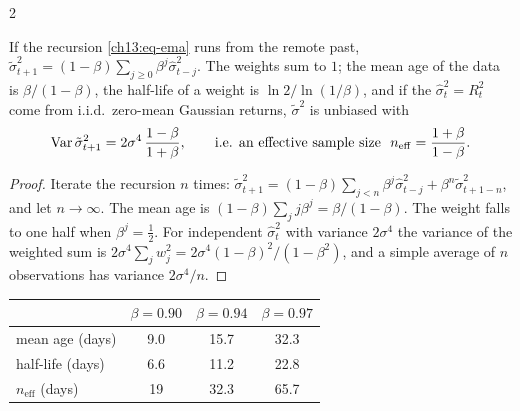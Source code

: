 \begin{paracol}{2}
\begin{proposition}\label{ch13:prop-ewma}
If the recursion \eqref{ch13:eq-ema} runs from the remote past, $\tilde\sigma^2_{t+1}=(1-\beta)\sum_{j\ge0}\beta^j\hat\sigma^2_{t-j}$.
The weights sum to $1$; the mean age of the data is $\beta/(1-\beta)$, the half-life of a weight is $\ln2/\ln(1/\beta)$, and if the
$\hat\sigma_t^2=R_t^2$ come from i.i.d.\ zero-mean Gaussian returns, $\tilde\sigma^2$ is unbiased with
\[
  \operatorname{Var}\tilde\sigma^2_{t+1}=2\sigma^4\,\frac{1-\beta}{1+\beta},\qquad\text{i.e. an effective sample size }\
  n_{\mathrm{eff}}=\frac{1+\beta}{1-\beta}.
\]
\end{proposition}
\begin{proof}
Iterate the recursion $n$ times: $\tilde\sigma^2_{t+1}=(1-\beta)\sum_{j<n}\beta^j\hat\sigma^2_{t-j}+\beta^n\tilde\sigma^2_{t+1-n}$, and let $n\to\infty$.
The mean age is $(1-\beta)\sum_jj\beta^j=\beta/(1-\beta)$. The weight falls to one half when $\beta^j=\frac12$. For independent
$\hat\sigma^2_t$ with variance $2\sigma^4$ the variance of the weighted sum is $2\sigma^4\sum_jw_j^2=2\sigma^4(1-\beta)^2/(1-\beta^2)$, and a
simple average of $n$ observations has variance $2\sigma^4/n$.
\end{proof}
\begin{center}\small
\begin{tabular}{@{}lccc@{}}
\toprule
 & $\beta=0.90$ & $\beta=0.94$ & $\beta=0.97$\\
\midrule
mean age (days) & 9.0 & 15.7 & 32.3\\
half-life (days) & 6.6 & 11.2 & 22.8\\
$n_{\mathrm{eff}}$ (days) & 19 & 32.3 & 65.7\\
\bottomrule
\end{tabular}
\end{center}
\begin{figure}[ht]
\centering
{}
\end{figure}
\end{paracol}
